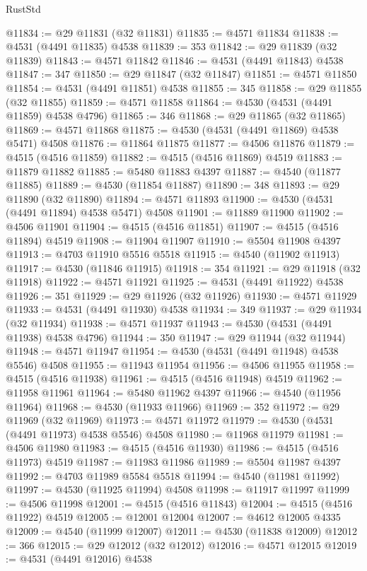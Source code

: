 \begin{lexlean}{RustStd}
\begin{coremodule}
{\begin{coremodule}
{{{{{{{{{{{{{{{{{{{{{{{{{{{{{{{{{{{{{{{{{{{{{{{{{{{{{{{@11834 := @29 @11831 (@32 @11831)
@11835 := @4571 @11834
@11838 := @4531 (@4491 @11835) @4538
@11839 := 353
@11842 := @29 @11839 (@32 @11839)
@11843 := @4571 @11842
@11846 := @4531 (@4491 @11843) @4538
@11847 := 347
@11850 := @29 @11847 (@32 @11847)
@11851 := @4571 @11850
@11854 := @4531 (@4491 @11851) @4538
@11855 := 345
@11858 := @29 @11855 (@32 @11855)
@11859 := @4571 @11858
@11864 := @4530 (@4531 (@4491 @11859) @4538 @4796)
@11865 := 346
@11868 := @29 @11865 (@32 @11865)
@11869 := @4571 @11868
@11875 := @4530 (@4531 (@4491 @11869) @4538 @5471) @4508
@11876 := @11864 @11875
@11877 := @4506 @11876
@11879 := @4515 (@4516 @11859)
@11882 := @4515 (@4516 @11869) @4519
@11883 := @11879 @11882
@11885 := @5480 @11883 @4397
@11887 := @4540 (@11877 @11885)
@11889 := @4530 (@11854 @11887)
@11890 := 348
@11893 := @29 @11890 (@32 @11890)
@11894 := @4571 @11893
@11900 := @4530 (@4531 (@4491 @11894) @4538 @5471) @4508
@11901 := @11889 @11900
@11902 := @4506 @11901
@11904 := @4515 (@4516 @11851)
@11907 := @4515 (@4516 @11894) @4519
@11908 := @11904 @11907
@11910 := @5504 @11908 @4397
@11913 := @4703 @11910 @5516 @5518
@11915 := @4540 (@11902 @11913)
@11917 := @4530 (@11846 @11915)
@11918 := 354
@11921 := @29 @11918 (@32 @11918)
@11922 := @4571 @11921
@11925 := @4531 (@4491 @11922) @4538
@11926 := 351
@11929 := @29 @11926 (@32 @11926)
@11930 := @4571 @11929
@11933 := @4531 (@4491 @11930) @4538
@11934 := 349
@11937 := @29 @11934 (@32 @11934)
@11938 := @4571 @11937
@11943 := @4530 (@4531 (@4491 @11938) @4538 @4796)
@11944 := 350
@11947 := @29 @11944 (@32 @11944)
@11948 := @4571 @11947
@11954 := @4530 (@4531 (@4491 @11948) @4538 @5546) @4508
@11955 := @11943 @11954
@11956 := @4506 @11955
@11958 := @4515 (@4516 @11938)
@11961 := @4515 (@4516 @11948) @4519
@11962 := @11958 @11961
@11964 := @5480 @11962 @4397
@11966 := @4540 (@11956 @11964)
@11968 := @4530 (@11933 @11966)
@11969 := 352
@11972 := @29 @11969 (@32 @11969)
@11973 := @4571 @11972
@11979 := @4530 (@4531 (@4491 @11973) @4538 @5546) @4508
@11980 := @11968 @11979
@11981 := @4506 @11980
@11983 := @4515 (@4516 @11930)
@11986 := @4515 (@4516 @11973) @4519
@11987 := @11983 @11986
@11989 := @5504 @11987 @4397
@11992 := @4703 @11989 @5584 @5518
@11994 := @4540 (@11981 @11992)
@11997 := @4530 (@11925 @11994) @4508
@11998 := @11917 @11997
@11999 := @4506 @11998
@12001 := @4515 (@4516 @11843)
@12004 := @4515 (@4516 @11922) @4519
@12005 := @12001 @12004
@12007 := @4612 @12005 @4335
@12009 := @4540 (@11999 @12007)
@12011 := @4530 (@11838 @12009)
@12012 := 366
@12015 := @29 @12012 (@32 @12012)
@12016 := @4571 @12015
@12019 := @4531 (@4491 @12016) @4538
}}}}}}}}}}}}}}}}}}}}}}}}}}}}}}}}}}}}}}}}}}}}}}}}}}}}}}}
\end{coremodule}}
\end{coremodule}
\end{lexlean}
